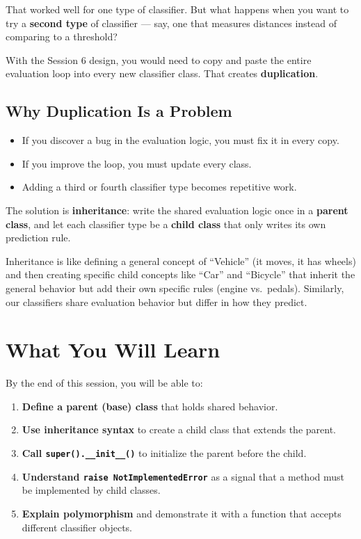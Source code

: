 \noindent
That worked well for one type of classifier. But what happens when you want to try a \textbf{second type} of classifier --- say, one that measures distances instead of comparing to a threshold?

\medskip
\noindent
With the Session 6 design, you would need to copy and paste the entire evaluation loop into every new classifier class.
That creates \textbf{duplication}.

\subsection{Why Duplication Is a Problem}

\begin{itemize}\setlength{\itemsep}{2pt}
    \item If you discover a bug in the evaluation logic, you must fix it in every copy.
    \item If you improve the loop, you must update every class.
    \item Adding a third or fourth classifier type becomes repetitive work.
\end{itemize}

\noindent
The solution is \textbf{inheritance}: write the shared evaluation logic once in a \textbf{parent class}, and let each classifier type be a \textbf{child class} that only writes its own prediction rule.

\begin{tcolorbox}[title=Real-World Hook]
Inheritance is like defining a general concept of ``Vehicle'' (it moves, it has wheels) and then creating specific child concepts like ``Car'' and ``Bicycle'' that inherit the general behavior but add their own specific rules (engine vs.\ pedals). Similarly, our classifiers share evaluation behavior but differ in how they predict.
\end{tcolorbox}

\section{What You Will Learn}
By the end of this session, you will be able to:
\begin{enumerate}
    \item \textbf{Define a parent (base) class} that holds shared behavior.
    \item \textbf{Use inheritance syntax} to create a child class that extends the parent.
    \item \textbf{Call \texttt{super().\_\_init\_\_()}} to initialize the parent before the child.
    \item \textbf{Understand \texttt{raise NotImplementedError}} as a signal that a method must be implemented by child classes.
    \item \textbf{Explain polymorphism} and demonstrate it with a function that accepts different classifier objects.
\end{enumerate}

